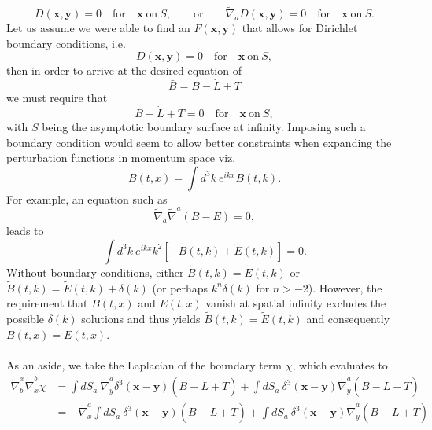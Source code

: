 \documentclass[10pt,letterpaper]{article}
\begin{document}
\begin{equation}
D(\mathbf x, \mathbf y) = 0\quad\text{for}\quad \mathbf x\ \text{on}\ S,\qquad \text{or}\qquad \tilde\nabla_a D(\mathbf x, \mathbf y) = 0\quad\text{for}\quad \mathbf x\ \text{on}\ S.
\end{equation}
Let us assume we were able to find an $F(\mathbf x,\mathbf y)$ that allows for Dirichlet boundary conditions, i.e.
\begin{equation}
D(\mathbf x, \mathbf y) = 0\quad\text{for}\quad \mathbf x\ \text{on}\ S,
\end{equation}
then in order to arrive at the desired equation of
\begin{equation}
\bar B = B - \dot L + T
\end{equation}
we must require that 
\begin{equation}
B - \dot L + T = 0\quad\text{for}\quad \mathbf x\ \text{on}\ S,
\end{equation}
with $S$ being the asymptotic boundary surface at infinity. Imposing such a boundary condition would seem to allow better constraints when expanding the perturbation functions in momentum space viz.
\begin{equation}
B(t,x) = \int d^3k\ e^{ikx} \tilde B(t,k).
\end{equation}
For example, an equation such as
\begin{equation}
\tilde\nabla_a \tilde\nabla^a (B-E) = 0,
\end{equation}
leads to
\begin{equation}
\int d^3k\ e^{ikx} k^2 [-\tilde B(t,k)+\tilde E(t,k)] = 0.
\end{equation}
Without boundary conditions, either $\tilde B(t,k) = \tilde E(t,k)$ or $\tilde B(t,k)=\tilde E(t,k)+\delta(k)$ (or perhaps $k^n \delta(k)$ for $n>-2$). However, the requirement that $B(t,x)$ and $E(t,x)$ vanish at spatial infinity excludes the possible $\delta(k)$ solutions and thus yields $\tilde B(t,k) = \tilde E(t,k)$ and consequently $B(t,x) = E(t,x)$.
\\ \\
As an aside, we take the Laplacian of the boundary term $\chi$, which evaluates to
\begin{align}
\tilde\nabla_b^x\tilde\nabla^b_x \chi &=  \int dS_a\   \tilde\nabla^a_y \delta^3(\mathbf x - \mathbf y)(B-\dot L + T) + \int dS_a\  \delta^3(\mathbf x - \mathbf y)\tilde\nabla^a_y(B-\dot L + T)
\nonumber \\
&= -\tilde\nabla^a_x \int dS_a\ \delta^3(\mathbf x- \mathbf y)(B-\dot L + T)+ \int dS_a\  \delta^3(\mathbf x - \mathbf y)\tilde\nabla^a_y(B-\dot L + T)
\end{align}
\end{document}
